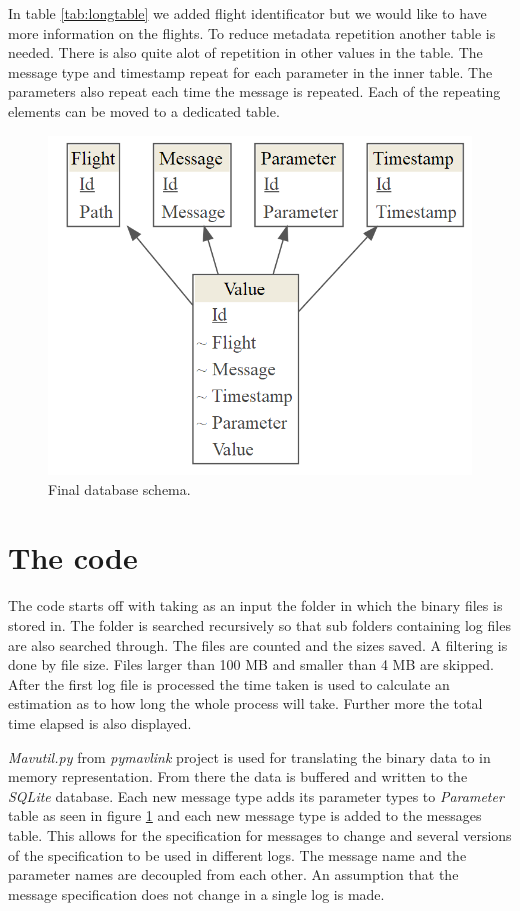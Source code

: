 \documentclass[12pt,oneside]{reedthesis}
\theoremstyle{definition}
\theoremstyle{definition}
\theoremstyle{definition}
\theoremstyle{remark}
\begin{document}
In table \ref{tab:longtable} we added flight identificator but we would
like to have more information on the flights. To reduce metadata
repetition another table is needed. There is also quite alot of
repetition in other values in the table. The message type and timestamp
repeat for each parameter in the inner table. The parameters also repeat
each time the message is repeated. Each of the repeating elements can be
moved to a dedicated table.
\begin{figure}
\centering
\includegraphics{./figure/databaseSchema.PNG}
\caption{\label{fig:database}Final database schema.}
\end{figure}
\section{The code}\label{the-code}

The code starts off with taking as an input the folder in which the
binary files is stored in. The folder is searched recursively so that
sub folders containing log files are also searched through. The files
are counted and the sizes saved. A filtering is done by file size. Files
larger than 100 MB and smaller than 4 MB are skipped. After the first
log file is processed the time taken is used to calculate an estimation
as to how long the whole process will take. Further more the total time
elapsed is also displayed.

\emph{Mavutil.py} from \emph{pymavlink} project is used for translating
the binary data to in memory representation. From there the data is
buffered and written to the \emph{SQLite} database. Each new message
type adds its parameter types to \emph{Parameter} table as seen in
figure \ref{fig:database} and each new message type is added to the
messages table. This allows for the specification for messages to change
and several versions of the specification to be used in different logs.
The message name and the parameter names are decoupled from each other.
An assumption that the message specification does not change in a single
log is made.
\end{document}
